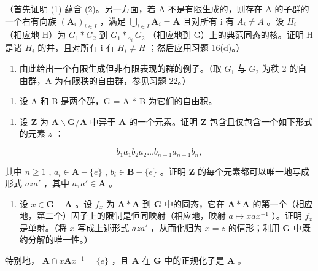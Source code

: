 （首先证明 (1) 蕴含 (2)。另一方面，若 A 不是有限生成的，则存在 A 的子群的一个右有向族 \((\mathbf{A}_{i})_{i\in I}\) ，满足 \(\bigcup_{i\in I}\mathbf{A}_{i}=\mathbf{A}\) 且对所有 i 有 \(A_{i}\neq A\) 。设 \(H_{i}\) （相应地 H）为 \(G_{1}*G_{2}\) 到 \(G_{1}*_{A_{i}}G_{2}\) （相应地到 G）上的典范同态的核。证明 H 是诸 \(H_{i}\) 的并，且对所有 i 有 \(H_{i}\neq H\) ；然后应用习题 16(d)。）

\begin{enumerate}
\def\labelenumi{(\alph{enumi})}
\setcounter{enumi}{2}
\tightlist
\item
  由此给出一个有限生成但非有限表现的群的例子。（取 \(G_{1}\) 与 \(G_{2}\) 为秩 2 的自由群，A 为有限秩的自由群，参见习题 22。）
\end{enumerate}

\begin{enumerate}
\def\labelenumi{\arabic{enumi}.}
\setcounter{enumi}{29}
\tightlist
\item
  设 A 和 B 是两个群，G = A * B 为它们的自由积。
\end{enumerate}

\begin{enumerate}
\def\labelenumi{(\alph{enumi})}
\tightlist
\item
  设 \(\mathbf{Z}\) 为 \(\mathbf{A} \backslash \mathbf{G} / \mathbf{A}\) 中异于 \(\mathbf{A}\) 的一个元素。证明 \(\mathbf{Z}\) 包含且仅包含一个如下形式的元素 \(z\) ：
\end{enumerate}

\[
b _ {1} a _ {1} b _ {2} a _ {2} \dots b _ {n - 1} a _ {n - 1} b _ {n},
\]

其中 \(n \geqslant 1\) , \(a_i \in \mathbf{A} - \{e\}\) , \(b_i \in \mathbf{B} - \{e\}\) 。证明 \(\mathbf{Z}\) 的每个元素都可以唯一地写成形式 \(aza'\) ，其中 \(a, a' \in \mathbf{A}\) 。

\begin{enumerate}
\def\labelenumi{(\alph{enumi})}
\setcounter{enumi}{1}
\tightlist
\item
  设 \(x \in \mathbf{G} - \mathbf{A}\) 。设 \(f_x\) 为 \(\mathbf{A} * \mathbf{A}\) 到 \(\mathbf{G}\) 中的同态，它在 \(\mathbf{A} * \mathbf{A}\) 的第一个（相应地，第二个）因子上的限制是恒同映射（相应地，映射 \(a \mapsto xax^{-1}\) ）。证明 \(f_x\) 是单射。（将 \(x\) 写成上述形式 \(aza'\) ，从而化归为 \(x = z\) 的情形；利用 \(\mathbf{G}\) 中既约分解的唯一性。）
\end{enumerate}

特别地， \(\mathbf{A} \cap x\mathbf{A}x^{-1} = \{e\}\) ，且 \(\mathbf{A}\) 在 \(\mathbf{G}\) 中的正规化子是 \(\mathbf{A}\) 。


